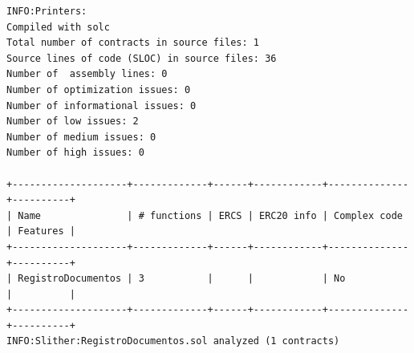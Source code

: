 \documentclass[
    12pt,
    a4paper,
    oneside,
    chapter=TITLE,
    section=TITLE,
    subsection=TITLE,
    subsubsection=TITLE,
    sumario=tradicional,
    english,
    brazil
]{abntex2}
\begin{document}
\begin{apendicesenv}
\begin{lstlisting}[style=saida]
INFO:Printers:
Compiled with solc
Total number of contracts in source files: 1
Source lines of code (SLOC) in source files: 36
Number of  assembly lines: 0
Number of optimization issues: 0
Number of informational issues: 0
Number of low issues: 2
Number of medium issues: 0
Number of high issues: 0

+--------------------+-------------+------+------------+--------------+----------+
| Name               | # functions | ERCS | ERC20 info | Complex code | Features |
+--------------------+-------------+------+------------+--------------+----------+
| RegistroDocumentos | 3           |      |            | No           |          |
+--------------------+-------------+------+------------+--------------+----------+
INFO:Slither:RegistroDocumentos.sol analyzed (1 contracts)
\end{lstlisting}

\end{apendicesenv}
\end{document}
